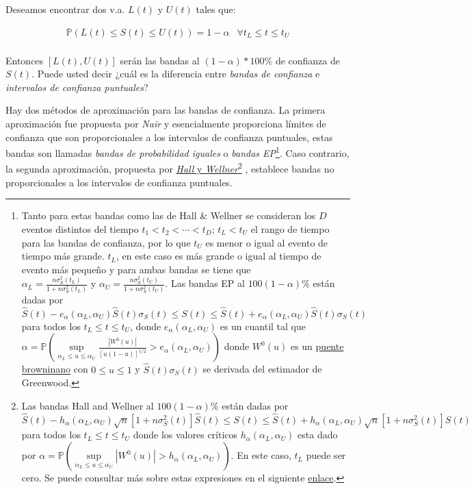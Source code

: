 \documentclass[
  a4paper,
  oneside,
  openany]{book}
\begin{document}
Deseamos encontrar dos v.a. \(L(t)\) y \(U(t)\) tales que:

\[
\begin{array}{ll}
\mathbb{P}(L(t)\leq S(t)\leq U(t)) = 1-\alpha & \forall t_{L}\leq t\leq t_{U}\\
\end{array}
\]

Entonces \([L(t), U(t)]\) serán las bandas al \((1-\alpha)*100\%\) de confianza de \(S(t)\). Puede usted decir ¿cuál es la diferencia entre \emph{bandas de confianza} e \emph{intervalos de confianza puntuales}?

Hay dos métodos de aproximación para las bandas de confianza. La primera aproximación fue propuesta por \emph{Nair} \citep{nair1984confidence} y esencialmente proporciona límites de confianza que son proporcionales a los intervalos de confianza puntuales, estas bandas son llamadas \emph{bandas de probabilidad iguales} o \emph{bandas EP}\footnote{Tanto para estas bandas como las de Hall \& Wellner se consideran los \(D\) eventos distintos del tiempo \(t_1<t_2<\cdots<t_D\); \(t_L<t_U\) el rango de tiempo para las bandas de confianza, por lo que \(t_U\) es menor o igual al evento de tiempo más grande. \(t_L\), en este caso es más grande o igual al tiempo de evento más pequeño y para ambas bandas se tiene que \(\alpha_L = \frac{n\sigma^2_S(t_L)}{1+n\sigma^2_S(t_L)} \mbox{ y } \alpha_U = \frac{n\sigma^2_S(t_U)}{1+n\sigma^2_S(t_U)}\).
  Las bandas EP al \(100(1-\alpha)\%\) están dadas por \[\hat{S}(t)-e_{\alpha}(\alpha_L, \alpha_U)\hat{S}(t)\sigma_S(t)\leq S(t)\leq\hat{S}(t)+e_{\alpha}(\alpha_L, \alpha_U)\hat{S}(t)\sigma_S(t)\] para todos los \(t_L\leq t\leq t_U\), donde \(e_{\alpha}(\alpha_L, \alpha_U)\) es un cuantil tal que \(\alpha = \mathbb{P}\left(\sup\limits_{\alpha_L\leq u\leq \alpha_U}\frac{|W^0(u)|}{[u(1-u)]^{1/2}}> e_{\alpha}\left(\alpha_L, \alpha_U\right)\right)\) donde \(W^0(u)\) es un \href{https://en.wikipedia.org/wiki/Brownian_bridge}{puente browninano} con \(0\leq u\leq1\) y \(\hat{S}(t)\sigma_S(t)\) se derivada del estimador de Greenwood.}. Caso contrario, la segunda aproximación, propuesta por \href{http://www.ressources-actuarielles.net/EXT/ISFA/1226.nsf/0/b163cbaba7cf2db9c125776b004d3573/\%24FILE/Hall_Wellner_1980.pdf}{\emph{Hall} y \emph{Wellner}}\footnote{Las bandas Hall and Wellner al \(100(1-\alpha)\%\) están dadas por \(\hat{S}(t)-h_{\alpha}(\alpha_L, \alpha_U)\sqrt{n}\left[1+n\sigma^2_S(t)\right]\hat{S}(t)\leq S(t)\leq\hat{S}(t)+h_{\alpha}(\alpha_L, \alpha_U)\sqrt{n}\left[1+n\sigma^2_S(t)\right]\hat{S}(t)\) para todos los \(t_L\leq t\leq t_U\) donde los valores críticos \(h_\alpha(\alpha_L, \alpha_U)\) esta dado por \(\alpha = \mathbb{P}\left(\sup\limits_{\alpha_L\leq u\leq \alpha_U}|W^0(u)|> h_\alpha\left(\alpha_L, \alpha_U\right)\right)\). En este caso, \(t_L\) puede ser cero. Se puede consultar más sobre estas expresiones en el siguiente \href{https://documentation.sas.com/?cdcId=pgmsascdc\&cdcVersion=9.4_3.4\&docsetId=statug\&docsetTarget=statug_lifetest_details11.htm\&locale=ko}{enlace}.} \citep{hall1980confidence}, establece bandas no proporcionales a los intervalos de confianza puntuales.
\end{document}
